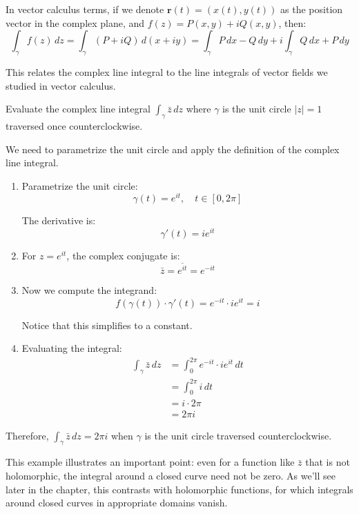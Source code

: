 \noindent In vector calculus terms, if we denote $\mathbf{r}(t) = (x(t), y(t))$ as the position vector in the complex plane, and $f(z) = P(x,y) + iQ(x,y)$, then:
\[
\int_{\gamma} f(z) \, dz = \int_{\gamma} (P + iQ) \, d(x + iy) = \int_{\gamma} P \, dx - Q \, dy + i\int_{\gamma} Q \, dx + P \, dy
\]

\noindent This relates the complex line integral to the line integrals of vector fields we studied in vector calculus.

\exampleline
\begin{example}
Evaluate the complex line integral $\displaystyle\int_{\gamma} \bar{z} \, dz$ where $\gamma$ is the unit circle $|z| = 1$ traversed once counterclockwise.

\begin{solution}
We need to parametrize the unit circle and apply the definition of the complex line integral.

\begin{enumerate}
\item Parametrize the unit circle:
   \[
   \gamma(t) = e^{it}, \quad t \in [0, 2\pi]
   \]
   
   The derivative is:
   \[
   \gamma'(t) = ie^{it}
   \]

\item For $z = e^{it}$, the complex conjugate is:
   \[
   \bar{z} = \overline{e^{it}} = e^{-it}
   \]

\item Now we compute the integrand:
   \[
   f(\gamma(t)) \cdot \gamma'(t) = e^{-it} \cdot ie^{it} = i
   \]
   
   Notice that this simplifies to a constant.

\item Evaluating the integral:
   \begin{align*}
   \int_{\gamma} \bar{z} \, dz &= \int_0^{2\pi} e^{-it} \cdot ie^{it} \, dt \\
   &= \int_0^{2\pi} i \, dt \\
   &= i \cdot 2\pi \\
   &= 2\pi i
   \end{align*}
\end{enumerate}

Therefore, $\displaystyle\int_{\gamma} \bar{z} \, dz = 2\pi i$ when $\gamma$ is the unit circle traversed counterclockwise.

\noindent This example illustrates an important point: even for a function like $\bar{z}$ that is not holomorphic, the integral around a closed curve need not be zero. As we'll see later in the chapter, this contrasts with holomorphic functions, for which integrals around closed curves in appropriate domains vanish.
\end{solution}
\end{example}
\exampleline










